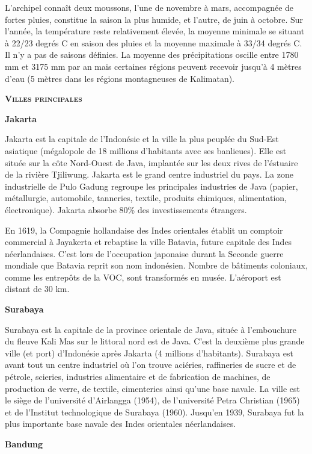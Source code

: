 L'archipel connaît deux moussons, l'une de novembre à mars, accompagnée de fortes pluies, constitue la saison la plus humide, et l'autre, de juin à octobre. Sur l'année, la température reste relativement élevée, la moyenne minimale se situant à 22/23 degrés C en saison des pluies et la moyenne maximale à 33/34 degrés C. Il n'y a pas de saisons définies. La moyenne des précipitations oscille entre 1780 mm et 3175 mm par an mais certaines régions peuvent recevoir jusqu'à 4 mètres d'eau (5 mètres dans les régions montagneuses de Kalimatan).

\textbf{\textsc{Villes principales}}

\textbf{Jakarta}

Jakarta est la capitale de l'Indonésie et la ville la plus peuplée du Sud-Est asiatique (mégalopole de 18 millions d'habitants avec ses banlieues). Elle est située sur la côte Nord-Ouest de Java, implantée sur les deux rives de l'éstuaire de la rivière Tjiliwung. Jakarta est le grand centre industriel du pays. La zone industrielle de Pulo Gadung regroupe les principales industries de Java (papier, métallurgie, automobile, tanneries, textile, produits chimiques, alimentation, électronique). Jakarta absorbe 80\% des investissements étrangers.

En 1619, la Compagnie hollandaise des Indes orientales établit un comptoir commercial à Jayakerta et rebaptise la ville Batavia, future capitale des Indes néerlandaises. C'est lors de l'occupation japonaise durant la Seconde guerre mondiale que Batavia reprit son nom indonésien. Nombre de bâtiments coloniaux, comme les entrepôts de la VOC, sont transformés en musée. L'aéroport est distant de 30 km.

\textbf{Surabaya}

Surabaya est la capitale de la province orientale de Java, située à l'embouchure du fleuve Kali Mas sur le littoral nord est de Java. C'est la deuxième plus grande ville (et port) d'Indonésie après Jakarta (4 millions d'habitants). Surabaya est avant tout un centre industriel où l'on trouve aciéries, raffineries de sucre et de pétrole, scieries, industries alimentaire et de fabrication de machines, de production de verre, de textile, cimenteries ainsi qu'une base navale. La ville est le siège de l'université d'Airlangga (1954), de l'université Petra Christian (1965) et de l'Institut technologique de Surabaya (1960). Jusqu'en 1939, Surabaya fut la plus importante base navale des Indes orientales néerlandaises.

\textbf{Bandung}

